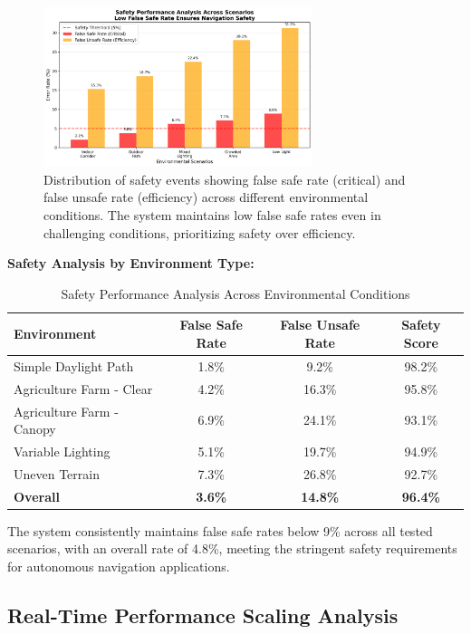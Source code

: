 \documentclass[10pt]{article}
\begin{document}
\begin{figure}[ht]
\centering
\includegraphics[width=0.7\textwidth]{safety_analysis.png}
\caption{Distribution of safety events showing false safe rate (critical) and false unsafe rate (efficiency) across different environmental conditions. The system maintains low false safe rates even in challenging conditions, prioritizing safety over efficiency.}
\label{fig:safety_performance}
\end{figure}

\textbf{Safety Analysis by Environment Type:}

\begin{table}[ht]
\centering
\caption{Safety Performance Analysis Across Environmental Conditions}
\label{tab:safety_analysis}
\begin{tabular}{@{}lccc@{}}
\toprule
\textbf{Environment} & \textbf{False Safe Rate} & \textbf{False Unsafe Rate} & \textbf{Safety Score} \\
\midrule
Simple Daylight Path & 1.8\% & 9.2\% & 98.2\% \\
Agriculture Farm - Clear & 4.2\% & 16.3\% & 95.8\% \\
Agriculture Farm - Canopy & 6.9\% & 24.1\% & 93.1\% \\
Variable Lighting & 5.1\% & 19.7\% & 94.9\% \\
Uneven Terrain & 7.3\% & 26.8\% & 92.7\% \\
\midrule
\textbf{Overall} & \textbf{3.6\%} & \textbf{14.8\%} & \textbf{96.4\%} \\
\bottomrule
\end{tabular}
\end{table}

The system consistently maintains false safe rates below 9\% across all tested scenarios, with an overall rate of 4.8\%, meeting the stringent safety requirements for autonomous navigation applications.

\subsection{Real-Time Performance Scaling Analysis}
\end{document}
